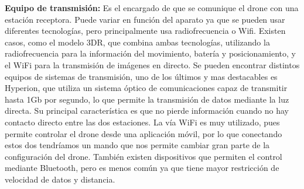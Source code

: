 \hspace{1 cm}\textbf{Equipo de transmisi\'on:} Es el encargado de que se comunique el drone con una estaci\'on receptora. Puede variar en funci\'on del aparato ya que se pueden usar diferentes tecnolog\'ias, pero principalmente usa radiofrecuencia o Wifi. Existen casos, como el modelo 3DR, que combina ambas tecnolog\'ias, utilizando la radiofrecuencia para la informaci\'on del movimiento, bater\'ia y posicionamiento, y el WiFi para la transmisi\'on de im\'agenes en directo. Se pueden encontrar distintos equipos de sistemas de transmisi\'on, uno de los \'ultimos y mas destacables es Hyperion, que utiliza un sistema \'optico de comunicaciones capaz de transmitir hasta 1Gb por segundo, lo que permite la transmisi\'on de datos mediante la luz directa. Su principal caracter\'istica es que no pierde informaci\'on cuando no hay contacto directo entre las dos estaciones. La v\'ia WiFi es muy utilizado, pues permite controlar el drone desde una aplicaci\'on m\'ovil, por lo que conectando estos dos tendr\'iamos un mando que nos permite cambiar gran parte de la configuraci\'on del drone. Tambi\'en existen dispositivos que permiten el control mediante Bluetooth, pero es menos com\'un ya que tiene mayor restricci\'on de velocidad de datos y distancia. 


